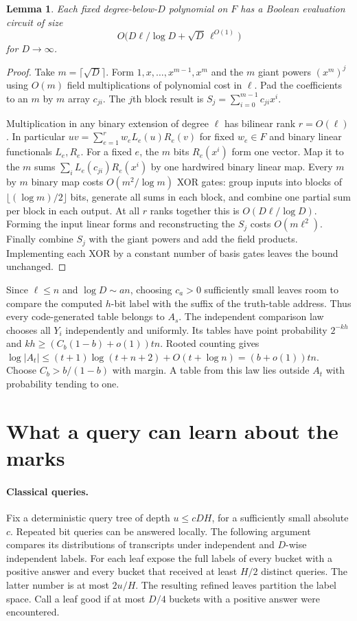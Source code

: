 \documentclass[11pt]{article}
\newtheorem{lemma}[theorem]{Lemma}
\begin{document}
\begin{lemma}\label{eval}
Each fixed degree-below-$D$ polynomial on $F$ has a Boolean evaluation circuit of size
\[
                  O\bigl(D\ell/\log D+\sqrt D\,\ell^{O(1)}\bigr)
\]
for $D\to\infty$.
\end{lemma}
\begin{proof}
Take $m=\lceil\sqrt D\rceil$. Form $1,x,\ldots,x^{m-1},x^m$ and the $m$ giant powers $(x^m)^j$ using $O(m)$ field multiplications of polynomial cost in $\ell$. Pad the coefficients to an $m$ by $m$ array $c_{ji}$. The $j$th block result is $S_j=\sum_{i=0}^{m-1} c_{ji}x^i$.

Multiplication in any binary extension of degree $\ell$ has bilinear rank $r=O(\ell)$ \cite{rank}. In particular $uv=\sum_{e=1}^r w_e L_e(u)R_e(v)$ for fixed $w_e\in F$ and binary linear functionals $L_e,R_e$. For a fixed $e$, the $m$ bits $R_e(x^i)$ form one vector. Map it to the $m$ sums $\sum_i L_e(c_{ji})R_e(x^i)$ by one hardwired binary linear map. Every $m$ by $m$ binary map costs $O(m^2/\log m)$ XOR gates: group inputs into blocks of $\lfloor(\log m)/2\rfloor$ bits, generate all sums in each block, and combine one partial sum per block in each output. At all $r$ ranks together this is $O(D\ell/\log D)$. Forming the input linear forms and reconstructing the $S_j$ costs $O(m\ell^2)$. Finally combine $S_j$ with the giant powers and add the field products. Implementing each XOR by a constant number of basis gates leaves the bound unchanged.
\end{proof}
Since $\ell\le n$ and $\log D\sim an$, choosing $c_a>0$ sufficiently small leaves room to compare the computed $h$-bit label with the suffix of the truth-table address. Thus every code-generated table belongs to $A_s$. The independent comparison law chooses all $Y_i$ independently and uniformly. Its tables have point probability $2^{-kh}$ and $kh\ge(C_b(1-b)+o(1))tn$. Rooted counting gives $\log|A_t|\le(t+1)\log(t+n+2)+O(t+\log n)=(b+o(1))tn$. Choose $C_b>b/(1-b)$ with margin. A table from this law lies outside $A_t$ with probability tending to one.

\section{What a query can learn about the marks}
\paragraph{Classical queries.}
Fix a deterministic query tree of depth $u\le cDH$, for a sufficiently small absolute $c$. Repeated bit queries can be answered locally. The following argument compares its distributions of transcripts under independent and $D$-wise independent labels. For each leaf expose the full labels of every bucket with a positive answer and every bucket that received at least $H/2$ distinct queries. The latter number is at most $2u/H$. The resulting refined leaves partition the label space. Call a leaf good if at most $D/4$ buckets with a positive answer were encountered.
\end{document}
